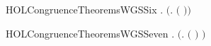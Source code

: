\newcommand{\HOLCongruenceTheoremsWGSFive}{\UseVerbatim{HOLCongruenceTheoremsWGSFive}}
\begin{SaveVerbatim}{HOLCongruenceTheoremsWGSSix}
\HOLTokenTurnstile{} \HOLSymConst{\HOLTokenForall{}} .   \HOLSymConst{\HOLTokenImp{}}  \ensuremath{(}\HOLTokenLambda{}.   \ensuremath{(} \ensuremath{)}\ensuremath{)}
\end{SaveVerbatim}
\newcommand{\HOLCongruenceTheoremsWGSSix}{\UseVerbatim{HOLCongruenceTheoremsWGSSix}}
\begin{SaveVerbatim}{HOLCongruenceTheoremsWGSSeven}
\HOLTokenTurnstile{} \HOLSymConst{\HOLTokenForall{}} .   \HOLSymConst{\HOLTokenImp{}}  \ensuremath{(}\HOLTokenLambda{}.  \ensuremath{(} \ensuremath{)} \ensuremath{)}
\end{SaveVerbatim}
\newcommand{\HOLCongruenceTheoremsWGSSeven}{\UseVerbatim{HOLCongruenceTheoremsWGSSeven}}
